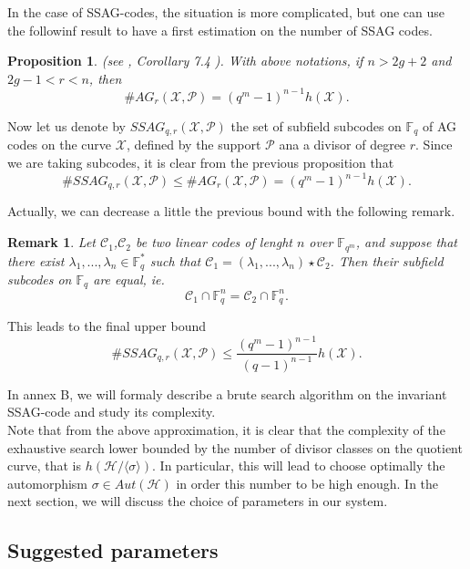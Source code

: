 \documentclass[10pt]{article}
\newtheorem{prop1}{Proposition}[]
\newtheorem{rq1}{Remark}[]
\newcommand{\s}{\vspace{0.3cm}}
\newcommand{\C}{\mathcal{C}}
\newcommand{\fqm}{\mathbb{F}_{q^m}}
\newcommand{\fq}{\mathbb{F}_q}
\newcommand{\X}{\mathcal{X}}
\newcommand{\PR}{\mathcal{P}}
\begin{document}
\s

In the case of SSAG-codes, the situation is more complicated, but one can use the followinf result to have a first estimation on the number of SSAG codes.

\s

\begin{prop1} \rm (\color{red}see \cite{CMRP}, Corollary 7.4 \color{black}). \it 
With above notations, if $n>2g+2$ and $2g-1<r<n$, then 
\[\#AG_r(\X,\PR) = (q^m-1)^{n-1}h(\X).\]
\end{prop1}

Now let us denote by $SSAG_{q,r}(\X,\PR)$ the set of subfield subcodes on $\fq$ of AG codes on the curve $\X$, defined by the support $\PR$ ana a divisor of degree $r$. Since we are taking subcodes, it is clear from the previous proposition that 
\[\#SSAG_{q,r}(\X,\PR) \leq \#AG_r(\X,\PR) = (q^m-1)^{n-1}h(\X).\]

Actually, we can decrease a little the previous bound with the following remark.

\s

\begin{rq1} \rm
Let $\C_1$,$\C_2$ be two linear codes of lenght $n$ over $\fqm$, and suppose that there exist $\lambda_1,...,\lambda_n \in \fq^*$ such that $\C_1 = (\lambda_1,...,\lambda_n) \star \C_2$. Then their subfield subcodes on $\fq$ are equal, ie.
\[\C_1 \cap \fq^n = \C_2 \cap \fq^n.\]
\end{rq1}

\s

This leads to the final upper bound 
\[ \#SSAG_{q,r}(\X,\PR) \leq \dfrac{(q^m-1)^{n-1}}{(q-1)^{n-1}}h(\X).\]

\s

In annex B, we will formaly describe a brute search algorithm on the invariant SSAG-code and study its complexity. \\
Note that from the above approximation, it is clear that the complexity of the exhaustive search lower bounded by the number of divisor classes on the quotient curve, that is $h(\mathcal{H}/\langle \sigma \rangle)$. In particular, this will lead to choose optimally the automorphism $\sigma \in Aut(\mathcal{H})$ in order this number to be high enough. In the next section, we will discuss the choice of parameters in our system.

\s

\subsection{Suggested parameters}
\end{document}
